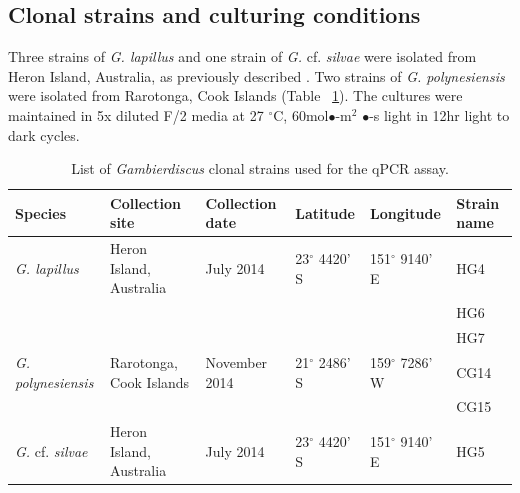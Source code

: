 \documentclass[12pt]{article}
\begin{document}
\subsection*{Clonal strains and culturing conditions}
\FloatBarrier
Three strains of \emph{G. lapillus} and one strain of \emph{G.} cf. \emph{silvae} were isolated from Heron Island, Australia, as previously described \citep{kretzschmar2017characterization}. 
Two strains of \emph{G. polynesiensis} were isolated from Rarotonga, Cook Islands (Table ~\ref{tbl:StrainTable}). 
The cultures were maintained in 5x diluted F/2 media \cite{holmes1991strain} at 27 $^{\circ}$C, 60mol$\bullet$-m$^{2}$ $\bullet$-s light in 12hr light to dark cycles.
\begin{table}  
\caption{List of \emph{Gambierdiscus} clonal strains used for the qPCR assay.}
\label{tbl:StrainTable}
\begin{tabular}{ | p{2cm} | p{2cm} | p{2cm}| p{3cm} | p{3cm} | p{2cm} | }
\hline
\textbf{Species} & \textbf{Collection site} & \textbf{Collection date} &\textbf{Latitude} & \textbf{Longitude} & \textbf{Strain name} \\
\hline
\emph{G. lapillus} &Heron Island, Australia &July 2014 &23$^{\circ}$ 4420' S&151$^{\circ}$ 9140' E & HG4 \\
\hline
&&&&& HG6\\
\hline
&&&& &HG7\\
\hline
\emph{G. polynesiensis}&Rarotonga, Cook Islands&November 2014 &21$^{\circ}$ 2486' S&159$^{\circ}$ 7286' W & CG14 \\
\hline
&&&&&CG15\\
\hline
\emph{G.} cf. \emph{silvae}&Heron Island, Australia &July 2014 &23$^{\circ}$ 4420' S&151$^{\circ}$ 9140' E& HG5\\
\hline
\end{tabular}
\end{table}
\FloatBarrier
\end{document}
